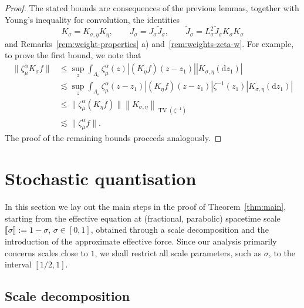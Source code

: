 \documentclass{article}
\numberwithin{equation}{section}
\newcommand{\assign}{:=}
\newcommand{\mathd}{\mathrm{d}}
\theoremstyle{plain}
\theoremstyle{definition}
\begin{document}
\begin{proof}
  The stated bounds are consequences of the previous lemmas, together with
  Young's inequality for convolution, the identities
  \[ K_{\sigma} = K_{\sigma, \eta} {K_{\eta}} , \qquad J_{\sigma} = J_{\sigma}
     \tilde{J}_{\sigma}, \qquad \tilde{J}_{\sigma} = L^2_{\sigma}
     \tilde{J}_{\sigma} K_{\sigma} K_{\sigma} \]
  and Remarks~\ref{rem:weight-properties} a) and~\ref{rem:weights-zeta-w}. For
  example, to prove the first bound, we note that
  \[ \begin{aligned}
       \| \zeta^{\alpha}_{\mu} K_{\sigma} f \| & \leqslant  \sup_z
       \int_{\Lambda_{\varepsilon}} \zeta^{\alpha}_{\mu} (z)  | (K_{\eta} f)
       (z - z_1) |  | K_{\sigma, \eta} (\mathd z_1) |\\
       & \lesssim  \sup_z \int_{\Lambda_{\varepsilon}} \zeta^{\alpha}_{\mu}
       (z - z_1)  | (K_{\eta} f) (z - z_1) | \zeta^{- 1} (z_1)  | K_{\sigma,
       \eta} (\mathd z_1) |\\
       & \leqslant  \| \zeta^{\alpha}_{\mu} (K_{\eta} f) \|  \left\|
       {K_{\sigma, \eta}}  \right\|_{\operatorname{TV} \left( {\zeta^{- 1}}
       \right)}\\
       & \lesssim  \| \zeta^{\alpha}_{\mu} f \| .
     \end{aligned} \]
  The proof of the remaining bounds proceeds analogously.
\end{proof}

\section{Stochastic quantisation}\label{sec:sq}

In this section we lay out the main steps in the proof of
Theorem~\ref{thm:main}, starting from the effective equation at (fractional,
parabolic) spacetime scale $\llbracket \sigma \rrbracket \assign 1 - \sigma$,
$\sigma \in [0, 1]$, obtained through a scale decomposition and the
introduction of the approximate effective force. Since our analysis primarily
concerns scales close to $1$, we shall restrict all scale parameters, such as
$\sigma$, to the interval $[1 / 2, 1]$.

\subsection{Scale decomposition}\label{sec:scale-decomposition}
\end{document}

